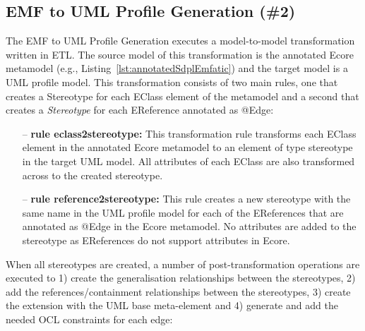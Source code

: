 \subsection{EMF to UML Profile Generation (\#2)}
\label{sec:profileGeneration}
The EMF to UML Profile Generation executes a model-to-model transformation written in ETL. 
The source model of this transformation is the annotated Ecore metamodel (e.g.,  Listing~\ref{lst:annotatedSdplEmfatic}) and the target model is a UML profile model.
This transformation consists of two main rules, one that creates a Stereotype for each EClass element of the metamodel and a second that creates a \textit{Stereotype} for each EReference annotated as @Edge:

\begin{itemize}
	\item[--] \textbf{rule eclass2stereotype:} This transformation rule transforms each EClass element in the annotated Ecore metamodel to an element of type stereotype in the target UML model. 
	All attributes of each EClass are also transformed across to the created stereotype. 
	\item[--] \textbf{rule reference2stereotype:} This rule creates a new stereotype with the same name in the UML profile model for each of the EReferences that are annotated as @Edge in the Ecore metamodel. 
	No attributes are added to the stereotype as EReferences do not support attributes in Ecore.
\end{itemize}

When all stereotypes are created, a number of post-transformation operations are executed to 1) create the generalisation relationships between the stereotypes, 2) add the references/containment relationships between the stereotypes, 3) create the extension with the UML base meta-element and 4) generate and add the needed OCL constraints for each edge: 

